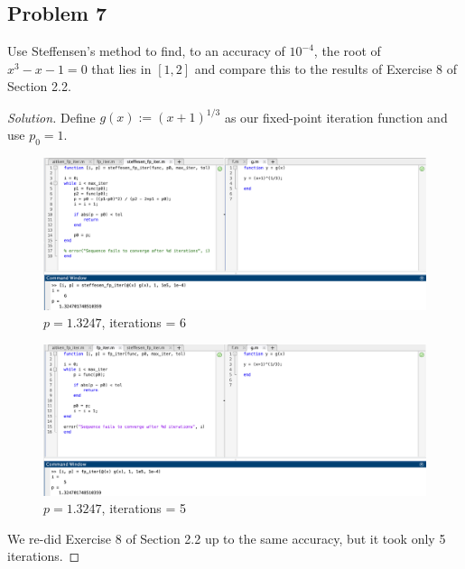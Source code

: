 \documentclass{article}
\begin{document}
\subsection*{Problem 7}
Use Steffensen's method to find, to an accuracy of $10^{-4}$, the root of $x^3-x-1=0$ that lies in 
$[1,2]$ and compare this to the results of Exercise 8 of Section 2.2.
\begin{proof}[Solution]
    Define $g(x):=(x+1)^{1/3}$ as our fixed-point iteration function and use $p_0=1$.
    \begin{figure}[htb!]
        \centering
        \includegraphics[scale=0.2]{2.5.7_1.png}
        \caption{$p = 1.3247$, iterations = 6}
    \end{figure}
    \begin{figure}[htb!]
        \centering
        \includegraphics[scale=0.2]{2.5.7_2.png}
        \caption{$p = 1.3247$, iterations = 5}
    \end{figure}

    We re-did Exercise 8 of Section 2.2 up to the same accuracy, but it took only 5 iterations.
\end{proof}
\end{document}
